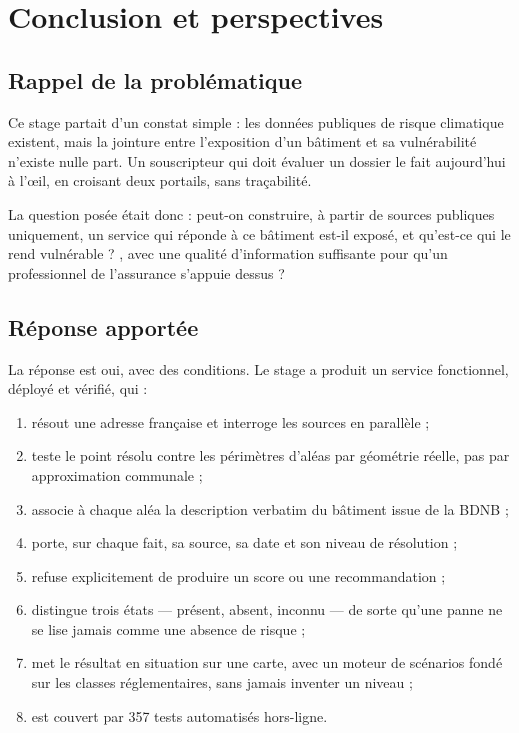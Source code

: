 \chapter{Conclusion et perspectives}
\label{ch:conclusion}

\section{Rappel de la problématique}

Ce stage partait d'un constat simple : les données publiques de risque
climatique existent, mais la jointure entre l'exposition d'un bâtiment et sa
vulnérabilité n'existe nulle part. Un souscripteur qui doit évaluer un dossier
le fait aujourd'hui à l'œil, en croisant deux portails, sans traçabilité.

La question posée était donc : peut-on construire, à partir de sources
publiques uniquement, un service qui réponde à \og ce bâtiment est-il exposé, et
qu'est-ce qui le rend vulnérable ? \fg{}, avec une qualité d'information
suffisante pour qu'un professionnel de l'assurance s'appuie dessus ?

\section{Réponse apportée}

La réponse est oui, avec des conditions. Le stage a produit un service
fonctionnel, déployé et vérifié, qui :

\begin{enumerate}[leftmargin=1.6em]
  \item résout une adresse française et interroge les sources en parallèle ;
  \item teste le point résolu contre les périmètres d'aléas par géométrie
        réelle, pas par approximation communale ;
  \item associe à chaque aléa la description verbatim du bâtiment issue de la
        BDNB ;
  \item porte, sur chaque fait, sa source, sa date et son niveau de résolution ;
  \item refuse explicitement de produire un score ou une recommandation ;
  \item distingue trois états — présent, absent, inconnu — de sorte qu'une
        panne ne se lise jamais comme une absence de risque ;
  \item met le résultat en situation sur une carte, avec un moteur de scénarios
        fondé sur les classes réglementaires, sans jamais inventer un niveau ;
  \item est couvert par 357 tests automatisés hors-ligne.
\end{enumerate}

